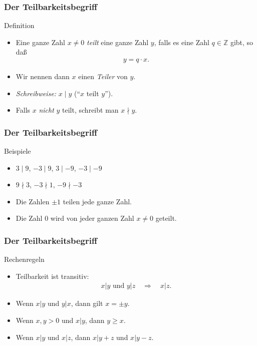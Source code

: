 \documentclass{beamer}
\renewcommand{\emph}[1]{{\textcolor{solarizedRed}{\itshape #1}}}
\newcommand\ZZ{\mathbb Z}
\begin{document}
\begin{frame}\frametitle{Der Teilbarkeitsbegriff}
\begin{block}{Definition}
\begin{itemize}
\item Eine ganze Zahl $x\neq0$ \emph{teilt} eine ganze Zahl $y$, falls es eine Zahl $q\in\ZZ$ gibt, so da\ss
	\begin{align*}
	y=q\cdot x.
	\end{align*}
\item Wir nennen dann $x$ einen \emph{Teiler} von $y$.
\item \emph{Schreibweise:} $x\mid y$ (``$x$ teilt $y$'').
\item Falls $x$ \emph{nicht} $y$ teilt, schreibt man $x\nmid y$.
\end{itemize}
\end{block}	
\end{frame}

\begin{frame}\frametitle{Der Teilbarkeitsbegriff}
	\begin{block}{Beispiele}
		\begin{itemize}
			\item $3\mid9$, $-3\mid9$, $3\mid-9$, $-3\mid-9$
			\item $9\nmid 3$, $-3\nmid 1$, $-9\nmid -3$
			\item Die Zahlen $\pm1$ teilen jede ganze Zahl.
			\item Die Zahl $0$ wird von jeder ganzen Zahl $x\neq0$ geteilt.
		\end{itemize}
	\end{block}	
\end{frame}

\begin{frame}\frametitle{Der Teilbarkeitsbegriff}
	\begin{block}{Rechenregeln}
		\begin{itemize}
			\item Teilbarkeit ist \alert{transitiv}:
				\begin{align*}
					x|y\mbox{ und }y|z\quad\Rightarrow\quad x|z.
				\end{align*}
			\item Wenn $x|y$ und $y|x$, dann gilt $x=\pm y$.
			\item Wenn $x,y>0$ und $x|y$, dann $y\geq x$.
			\item Wenn $x|y$ und $x|z$, dann $x|y+z$ und $x|y-z$.
		\end{itemize}
	\end{block}	
\end{frame}
\end{document}
